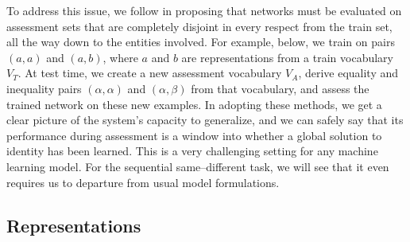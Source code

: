 \documentclass{article}
\newcommand{\update}[1]{#1}
\begin{document}
To address this issue, \update{we follow \citet{marcus:1999} in proposing} that networks must be evaluated on assessment sets that are completely disjoint in every respect from the train set, all the way down to the entities involved. For example, below, we train on pairs $(a, a)$ and $(a, b)$, where $a$ and $b$ are representations from a train vocabulary $V_{T}$. At test time, we create a new assessment vocabulary $V_{A}$, derive equality and inequality pairs $(\alpha, \alpha)$ and $(\alpha, \beta)$ from that vocabulary, and assess the trained network on these new examples. In adopting these methods, we get a clear picture of the system's capacity to generalize, and we can safely say that its performance during assessment is a window into whether a global solution to identity has been learned. This is a very challenging setting for any machine learning model. For the sequential same--different task, we will see that it even requires us to departure from usual model formulations.

\subsection{Representations}\label{sec:representations}

\newcommand{\mysquare}{
\begin{tikzpicture}[scale=0.5]
 \node[rectangle, fill=red!100, minimum height=3mm, minimum width=3mm]{};
\end{tikzpicture}}

\newcommand{\bluetriangle}{

\begin{tikzpicture}[scale=0.25]
 \node[regular polygon,regular polygon sides=3, fill=blue!100, inner sep=2pt]{};
\end{tikzpicture}}
\newcommand{\redtriangle}{
\begin{tikzpicture}[scale=0.5]
 \node[regular polygon,regular polygon sides=3, fill=red!100, inner sep=2pt]{};
\end{tikzpicture}}
\newcommand{\bluesquare}{
\begin{tikzpicture}[scale=0.5]
 \node[regular polygon,regular polygon sides=4, fill=blue!100, minimum height=3mm, minimum width=3mm]{};
\end{tikzpicture}}
\newcommand{\redsquare}{
\begin{tikzpicture}[scale=0.5]
 \node[regular polygon,regular polygon sides=4, fill=red!100, minimum height=3mm, minimum width=3mm]{};
\end{tikzpicture}}
\newcommand{\bluepentagon}{
\begin{tikzpicture}[scale=0.5]
 \node[regular polygon,regular polygon sides=5, fill=blue!100, minimum height=3mm, minimum width=3mm]{};
\end{tikzpicture}}
\newcommand{\redpentagon}{
\begin{tikzpicture}[scale=0.5]
 \node[regular polygon,regular polygon sides=5, fill=red!100, minimum height=3mm, minimum width=3mm]{};
\end{tikzpicture}}
\end{document}
